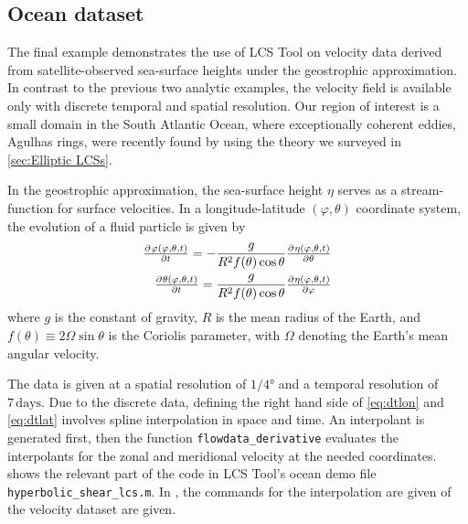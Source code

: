 \documentclass{elsarticle}
\begin{document}
\subsection{Ocean dataset}
\label{sec:oceandataset}

The final example demonstrates the use of LCS Tool on velocity data derived from satellite-observed sea-surface heights under the geostrophic approximation. In contrast to the previous two analytic examples, the velocity field is available only with discrete temporal and spatial resolution. Our region of interest is a small domain in the South Atlantic Ocean, where exceptionally coherent eddies, Agulhas rings, were recently found by \citet{haller13:_coher_lagran} using the theory we surveyed in \cref{sec:Elliptic LCSs}.

In the geostrophic approximation, the sea-surface height $\eta$ serves as a stream-function for surface velocities. In a longitude-latitude $(\varphi,\theta)$ coordinate system, the evolution of a fluid particle is given by
\begin{eqnarray}
\pd{\varphi(\varphi,\theta,t)}{t} = -\frac{g}{R^2 f(\theta) \cos\theta} \pd{\eta(\varphi,\theta,t)}{\theta}\label{eq:dtlon}\\
\pd{\theta(\varphi,\theta,t)}{t} = \frac{g}{R^2 f(\theta) \cos\theta}\pd{\eta(\varphi,\theta,t)}{\varphi}
\label{eq:dtlat}
\end{eqnarray}
where $g$ is the constant of gravity, $R$ is the mean radius of the Earth, and $f(\theta) \equiv 2\Omega\sin\theta$ is the Coriolis parameter, with $\Omega$ denoting the Earth's mean angular velocity.

The data is given at a spatial resolution of $1/4°$ and a temporal resolution of $7\,\mathrm{days}$. Due to the discrete data, defining the right hand side of \cref{eq:dtlon} and \cref{eq:dtlat} involves spline interpolation in space and time. An interpolant is generated first, then the function \lstinline!flowdata_derivative! evaluates the interpolants for the zonal and meridional velocity at the needed coordinates.  shows the relevant part of the code in LCS Tool's ocean demo file \lstinline!hyperbolic_shear_lcs.m!. In , the commands for the interpolation are given of the velocity dataset are given.
\end{document}
